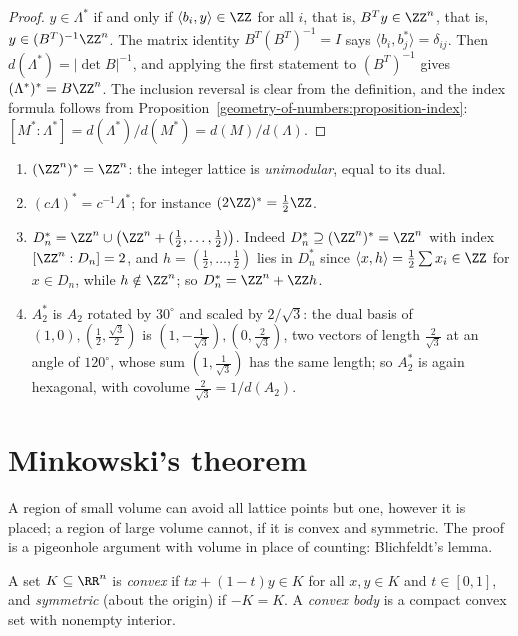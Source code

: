 \begin{proof}
$y \in \Lambda^*$ if and only if $\langle b_i, y \rangle \in \ZZ$ for all $i$, that is, $B^Ty \in \ZZ^n$, that is, $y \in (B^T)^{-1}\ZZ^n$. The matrix identity $B^T(B^T)^{-1} = I$ says
$\langle b_i, b_j^* \rangle = \delta_{ij}$. Then $d(\Lambda^*) = |\det B|^{-1}$, and applying the first statement to $(B^T)^{-1}$ gives $(\Lambda^*)^* = B\ZZ^n$. The inclusion reversal is clear from the
definition, and the index formula follows from Proposition~\ref{geometry-of-numbers:proposition-index}: $[M^* : \Lambda^*] = d(\Lambda^*)/d(M^*) = d(M)/d(\Lambda)$.
\end{proof}

\begin{example}\label{geometry-of-numbers:example-dual}
\begin{enumerate}
\item $(\ZZ^n)^* = \ZZ^n$: the integer lattice is \emph{unimodular}, equal to its dual.
\item $(c\Lambda)^* = c^{-1}\Lambda^*$; for instance $(2\ZZ)^* = \frac12\ZZ$.
\item $D_n^* = \ZZ^n \cup \bigl(\ZZ^n + (\frac12, \ldots, \frac12)\bigr)$. Indeed $D_n^* \supseteq (\ZZ^n)^* = \ZZ^n$ with index $[\ZZ^n : D_n] = 2$, and $h = (\frac12, \ldots, \frac12)$ lies in $D_n^*$
since $\langle x, h \rangle = \frac12\sum x_i \in \ZZ$ for $x \in D_n$, while $h \notin \ZZ^n$; so $D_n^* = \ZZ^n + \ZZ h$.
\item $A_2^*$ is $A_2$ rotated by $30^\circ$ and scaled by $2/\sqrt3$: the dual basis of $(1, 0), (\frac12, \frac{\sqrt3}{2})$ is $(1, -\frac1{\sqrt3}), (0, \frac2{\sqrt3})$, two vectors of length $\frac2{\sqrt3}$ at
an angle of $120^\circ$, whose sum $(1, \frac1{\sqrt3})$ has the same length; so $A_2^*$ is again hexagonal, with covolume $\frac{2}{\sqrt3} = 1/d(A_2)$.
\end{enumerate}
\end{example}

\section{Minkowski's theorem}\label{geometry-of-numbers:section-minkowski}

A region of small volume can avoid all lattice points but one, however it is placed; a region of large volume cannot, if it is convex and symmetric. The proof is a pigeonhole argument with volume
in place of counting: Blichfeldt's lemma.

\begin{definition}\label{geometry-of-numbers:definition-convex}
A set $K \subseteq \RR^n$ is \emph{convex} if $tx + (1 - t)y \in K$ for all $x, y \in K$ and $t \in [0, 1]$, and \emph{symmetric} (about the origin) if $-K = K$. A \emph{convex body} is a compact convex
set with nonempty interior.
\end{definition}

